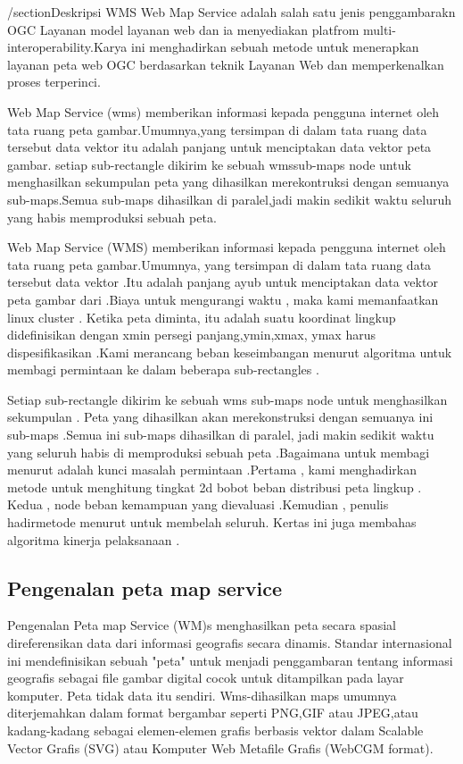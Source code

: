 
/section{Deskripsi WMS}
  Web Map Service adalah salah satu jenis penggambarakn OGC Layanan model layanan web dan ia menyediakan platfrom
multi-interoperability.Karya ini menghadirkan sebuah metode untuk menerapkan layanan peta web OGC berdasarkan teknik
Layanan Web dan memperkenalkan proses terperinci.
  
    Web Map Service (wms) memberikan informasi kepada pengguna internet oleh tata ruang peta gambar.Umumnya,yang tersimpan
di dalam tata ruang data tersebut data vektor itu adalah panjang untuk menciptakan data vektor peta gambar.
setiap sub-rectangle dikirim ke sebuah wmssub-maps node untuk menghasilkan sekumpulan peta yang dihasilkan merekontruksi
dengan semuanya sub-maps.Semua sub-maps dihasilkan di paralel,jadi makin sedikit waktu seluruh yang habis memproduksi
sebuah peta.

   Web Map Service (WMS) memberikan informasi kepada pengguna internet oleh tata ruang peta gambar.Umumnya,
yang tersimpan di dalam tata ruang data tersebut data vektor .Itu adalah panjang ayub untuk 
menciptakan data vektor peta gambar dari .Biaya untuk mengurangi waktu , maka kami memanfaatkan linux cluster .
Ketika peta diminta, itu adalah suatu koordinat lingkup didefinisikan dengan xmin persegi panjang,ymin,xmax, 
ymax harus dispesifikasikan .Kami merancang beban keseimbangan menurut algoritma untuk membagi permintaan ke dalam 
beberapa sub-rectangles .

   Setiap sub-rectangle dikirim ke sebuah wms sub-maps node untuk menghasilkan sekumpulan .
Peta yang dihasilkan akan merekonstruksi dengan semuanya ini sub-maps .Semua ini sub-maps dihasilkan di paralel, 
jadi makin sedikit waktu yang seluruh habis di memproduksi sebuah peta .Bagaimana untuk membagi menurut adalah 
kunci masalah permintaan .Pertama , kami menghadirkan metode untuk menghitung tingkat 2d bobot beban distribusi peta lingkup .
Kedua , node beban kemampuan yang dievaluasi .Kemudian , penulis hadirmetode menurut untuk membelah seluruh.
Kertas ini juga membahas algoritma kinerja pelaksanaan .

\subsection{Pengenalan peta map service}
   Pengenalan Peta map Service (WM)s menghasilkan peta secara spasial direferensikan data dari informasi geografis secara dinamis. 
Standar internasional ini mendefinisikan sebuah "peta" untuk menjadi penggambaran tentang informasi geografis 
sebagai file gambar digital cocok untuk ditampilkan pada layar komputer. Peta tidak data itu sendiri. 
Wms-dihasilkan maps umumnya diterjemahkan dalam format bergambar seperti PNG,GIF atau JPEG,atau kadang-kadang sebagai
elemen-elemen grafis berbasis vektor dalam Scalable Vector Grafis (SVG) atau Komputer Web Metafile Grafis (WebCGM format).

